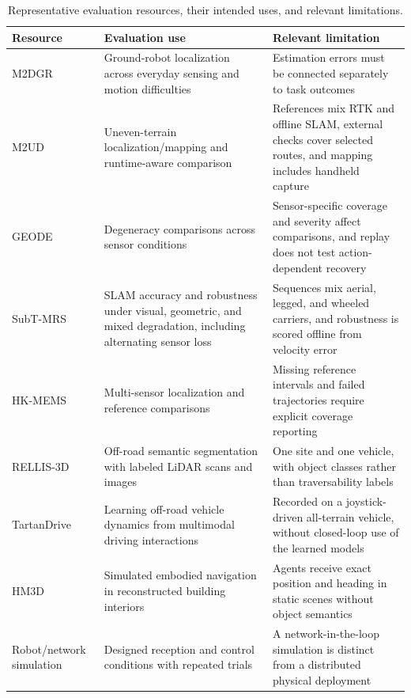 \begin{table}[t]
\centering
\caption{Representative evaluation resources, their intended uses, and relevant limitations.}
\label{tab:benchmarks}
\surveytableformat
\begin{tabularx}{\linewidth}{@{}L{2.8cm}L{5.4cm}Y@{}}
\toprule
\textbf{Resource} & \textbf{Evaluation use} & \textbf{Relevant limitation} \\
\midrule
M2DGR~\cite{P_M41} & Ground-robot localization across everyday sensing and motion difficulties & Estimation errors must be connected separately to task outcomes \\
\addlinespace[3pt]
M2UD~\cite{P_F11} & Uneven-terrain localization/mapping and runtime-aware comparison & References mix RTK and offline SLAM, external checks cover selected routes, and mapping includes handheld capture \\
\addlinespace[3pt]
GEODE~\cite{P_S33} & Degeneracy comparisons across sensor conditions & Sensor-specific coverage and severity affect comparisons, and replay does not test action-dependent recovery \\
\addlinespace[3pt]
SubT-MRS~\cite{P_K01} & SLAM accuracy and robustness under visual, geometric, and mixed degradation, including alternating sensor loss & Sequences mix aerial, legged, and wheeled carriers, and robustness is scored offline from velocity error \\
\addlinespace[3pt]
HK-MEMS~\cite{P_S21} & Multi-sensor localization and reference comparisons & Missing reference intervals and failed trajectories require explicit coverage reporting \\
\addlinespace[3pt]
RELLIS-3D~\cite{P_K02} & Off-road semantic segmentation with labeled LiDAR scans and images & One site and one vehicle, with object classes rather than traversability labels \\
\addlinespace[3pt]
TartanDrive~\cite{P_K04} & Learning off-road vehicle dynamics from multimodal driving interactions & Recorded on a joystick-driven all-terrain vehicle, without closed-loop use of the learned models \\
\addlinespace[3pt]
HM3D~\cite{P_K11} & Simulated embodied navigation in reconstructed building interiors & Agents receive exact position and heading in static scenes without object semantics \\
\addlinespace[3pt]
Robot/network simulation~\cite{P_F13} & Designed reception and control conditions with repeated trials & A network-in-the-loop simulation is distinct from a distributed physical deployment \\
\bottomrule
\end{tabularx}
\end{table}
